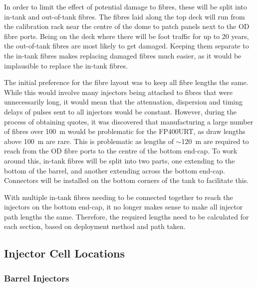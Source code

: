 \documentclass[a4paper,11pt]{article}
\let\oldsim\sim
\renewcommand{\sim}{{\oldsim}}
\begin{document}
\FloatBarrier
In order to limit the effect of potential damage to fibres, these will be split into in-tank and out-of-tank fibres. The fibres laid along the top deck will run from the calibration rack near the centre of the dome to patch panels next to the OD fibre ports. Being on the deck where there will be foot traffic for up to 20 years, the out-of-tank fibres are most likely to get damaged. Keeping them separate to the in-tank fibres makes replacing damaged fibres much easier, as it would be implausible to replace the in-tank fibres.

The initial preference for the fibre layout was to keep all fibre lengths the same. While this would involve many injectors being attached to fibres that were unnecessarily long, it would mean that the attenuation, dispersion and timing delays of pulses sent to all injectors would be constant. However, during the process of obtaining quotes, it was discovered that manufacturing a large number of fibres over 100~m would be problematic for the FP400URT, as draw lengths above 100~m are rare. This is problematic as lengths of $\sim$120~m are required to reach from the OD fibre ports to the centre of the bottom end-cap. To work around this, in-tank fibres will be split into two parts, one extending to the bottom of the barrel, and another extending across the bottom end-cap. Connectors will be installed on the bottom corners of the tank to facilitate this.

With multiple in-tank fibres needing to be connected together to reach the injectors on the bottom end-cap, it no longer makes sense to make all injector path lengths the same. Therefore, the required lengths need to be calculated for each section, based on deployment method and path taken. 

\subsection{Injector Cell Locations}\label{sec:lengths:sub:inj}
\subsubsection{Barrel Injectors}\label{sec:lengths:sub:inj:sub:barrel}
\end{document}
